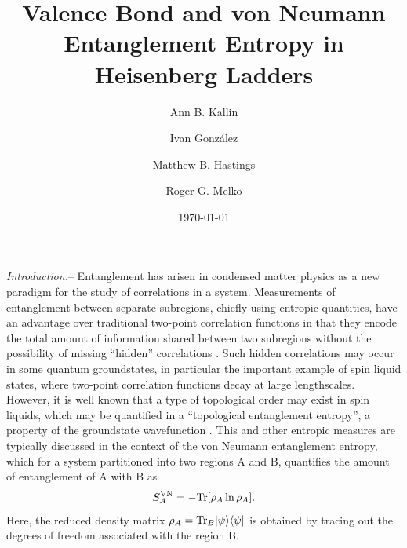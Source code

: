 \documentclass[prl,aps,twocolumn,floatfix,amsmath,amssymb,superscriptaddress,tightenlines]{revtex4}
\begin{document}
\date{\today}
\title{Valence Bond and von Neumann Entanglement Entropy in Heisenberg Ladders}
\author{Ann B. Kallin}

\author{Ivan Gonz\'alez}

\author{Matthew B. Hastings}

\author{Roger G. Melko}

\begin{abstract}

\end{abstract}
\maketitle


{\it Introduction.}-- Entanglement has arisen in condensed matter physics as a new paradigm for the study of correlations in a system.  Measurements of entanglement between separate subregions, chiefly using entropic quantities, have an advantage over traditional two-point correlation functions in that they encode the total amount of information shared between two subregions without the possibility of missing ``hidden'' correlations \cite{wolf}.  Such hidden correlations may occur in some quantum groundstates,  in particular the important example of spin liquid states, where two-point correlation functions decay at large lengthscales.  However, it is well known that a type of topological order may exist in spin liquids, which may be quantified in a ``topological entanglement entropy'', a property of the groundstate wavefunction \cite{ KP, LW}.  This and other entropic measures are typically discussed in the context of the von Neumann entanglement entropy, which for a system partitioned into two regions A and B, quantifies the amount of entanglement of A with B as
\begin{equation}
S^{\rm VN}_A = - {\rm Tr} [ \rho_A \ln \rho_A ]. \label{vNEE}
\end{equation}
Here, the reduced density matrix $\rho_A = {\rm Tr}_B | \psi \rangle \langle \psi |$ is obtained by tracing out the degrees of freedom associated with the region B.
\end{document}
